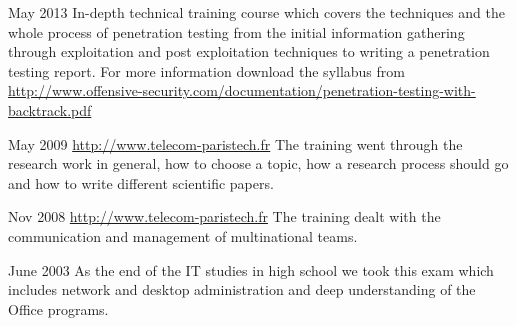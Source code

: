 {May 2013}
{In-depth technical training course which covers the techniques and the whole process of penetration testing from the initial information gathering through exploitation and post exploitation techniques to writing a penetration testing report. For more information download the syllabus from \url{http://www.offensive-security.com/documentation/penetration-testing-with-backtrack.pdf}}


{May 2009}
{\url{http://www.telecom-paristech.fr} \newline The training went through the research work in general, how to choose a topic, how a research process should go and how to write different scientific papers.}

{Nov 2008}
{\url{http://www.telecom-paristech.fr} \newline The training dealt with the communication and management of multinational teams.}

{June 2003}
{As the end of the IT studies in high school we took this exam which includes network and desktop administration and deep understanding of the Office programs.}
